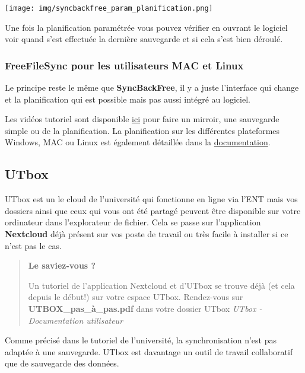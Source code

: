 \documentclass[
]{article}
\begin{document}
\texttt{[image: img/syncbackfree\_param\_planification.png]}

Une fois la planification paramétrée vous pouvez vérifier en ouvrant le
logiciel voir quand s'est effectuée la dernière sauvegarde et si cela
s'est bien déroulé.

\subsubsection{FreeFileSync pour les utilisateurs MAC et
Linux}\label{freefilesync-pour-les-utilisateurs-mac-et-linux}

Le principe reste le même que \textbf{SyncBackFree}, il y a juste
l'interface qui change et la planification qui est possible mais pas
aussi intégré au logiciel.

Les vidéos tutoriel sont disponible
\href{https://freefilesync.org/tutorials.php}{ici} pour faire un
mirroir, une sauvegarde simple ou de la planification. La planification
sur les différentes plateformes Windows, MAC ou Linux est également
détaillée dans la
\href{https://freefilesync.org/manual.php?topic=schedule-batch-jobs}{documentation}.

\subsection{UTbox}\label{utbox}

UTbox est un le cloud de l'université qui fonctionne en ligne via l'ENT
mais vos dossiers ainsi que ceux qui vous ont été partagé peuvent être
disponible sur votre ordinateur dans l'explorateur de fichier. Cela se
passe sur l'application \textbf{Nextcloud} déjà présent sur vos poste de
travail ou très facile à installer si ce n'est pas le cas.

\begin{quote}
\textbf{Le saviez-vous ?}

Un tutoriel de l'application Nextcloud et d'UTbox se trouve déjà (et
cela depuis le début!) sur votre espace UTbox. Rendez-vous sur
\textbf{UTBOX\_pas\_à\_pas.pdf} dans votre dossier UTbox \emph{UTbox -
Documentation utilisateur}
\end{quote}

Comme précisé dans le tutoriel de l'université, la synchronisation n'est
pas adaptée à une sauvegarde. UTbox est davantage un outil de travail
collaboratif que de sauvegarde des données.
\end{document}
